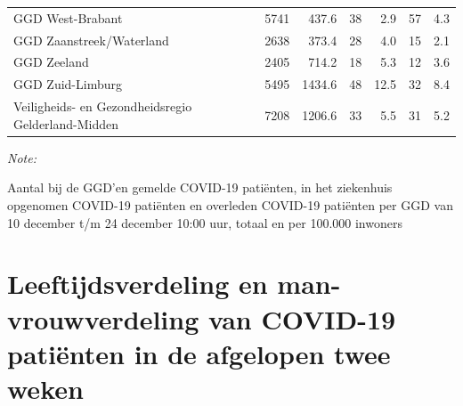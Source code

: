 \documentclass[
  english,
  man,floatsintext]{apa6}
\begin{document}
\begin{table}[H]
\begin{threeparttable}
\begin{tabular}{lrrrrrr}
GGD West-Brabant & 5741 & 437.6 & 38 & 2.9 & 57 & 4.3\\
GGD Zaanstreek/Waterland & 2638 & 373.4 & 28 & 4.0 & 15 & 2.1\\
GGD Zeeland & 2405 & 714.2 & 18 & 5.3 & 12 & 3.6\\
GGD Zuid-Limburg & 5495 & 1434.6 & 48 & 12.5 & 32 & 8.4\\
Veiligheids- en Gezondheidsregio Gelderland-Midden & 7208 & 1206.6 & 33 & 5.5 & 31 & 5.2\\
\bottomrule
\end{tabular}
\begin{tablenotes}
\item \textit{Note: } 
\item Aantal bij de GGD’en gemelde COVID-19 patiënten, in het ziekenhuis opgenomen COVID-19 patiënten en overleden COVID-19 patiënten per GGD van 10 december t/m 24 december 10:00 uur, totaal en per 100.000 inwoners
\end{tablenotes}
\end{threeparttable}
\endgroup{}
\end{table}

\newpage

\hypertarget{leeftijdsverdeling-en-man-vrouwverdeling-van-covid-19-patiuxebnten-in-de-afgelopen-twee-weken}{%
\section{Leeftijdsverdeling en man-vrouwverdeling van COVID-19 patiënten in de afgelopen twee weken}\label{leeftijdsverdeling-en-man-vrouwverdeling-van-covid-19-patiuxebnten-in-de-afgelopen-twee-weken}}
\end{document}
